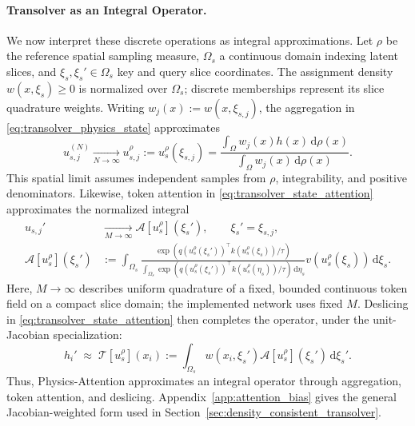 \paragraph{Transolver as an Integral Operator.}
We now interpret these discrete operations as integral approximations.
Let $\rho$ be the reference spatial sampling measure, $\Omega_s$ a
continuous domain indexing latent slices, and $\xi_s,\xi_s'\in\Omega_s$
key and query slice coordinates. The assignment density $w(x,\xi_s)\geq0$
is normalized over $\Omega_s$; discrete memberships represent its slice
quadrature weights. Writing $w_j(x):=w(x,\xi_{s,j})$, the aggregation in
\eqref{eq:transolver_physics_state} approximates
\begin{equation}
    u_{s,j}^{(N)}
    \xrightarrow[N\to\infty]{}
    u_{s,j}^{\rho}:=u_s^{\rho}(\xi_{s,j})
    =\frac{\int_{\Omega}w_j(x)h(x)\,\mathrm{d}\rho(x)}
           {\int_{\Omega}w_j(x)\,\mathrm{d}\rho(x)}.
    \label{eq:transolver_integral_token}
\end{equation}
This spatial limit assumes independent samples from $\rho$, integrability,
and positive denominators. Likewise, token attention in
\eqref{eq:transolver_state_attention} approximates the normalized integral
\begin{equation}
    \begin{aligned}
    u_{s,j}'&\xrightarrow[M\to\infty]{}
        \mathcal{A}[u_s^{\rho}](\xi_s'),\qquad \xi_s'=\xi_{s,j},\\
    \mathcal{A}[u_s^{\rho}](\xi_s')
    &:=\int_{\Omega_s}
      \frac{\exp\!\left(q(u_s^{\rho}(\xi_s'))^{\top}k(u_s^{\rho}(\xi_s))/\tau\right)}
           {\int_{\Omega_s}\exp\!\left(q(u_s^{\rho}(\xi_s'))^{\top}k(u_s^{\rho}(\eta_s))/\tau\right)\,\mathrm{d}\eta_s}
      v(u_s^{\rho}(\xi_s))\,\mathrm{d}\xi_s .
    \end{aligned}
    \label{eq:transolver_integral_attention}
\end{equation}
Here, $M\to\infty$ describes uniform quadrature of a fixed, bounded
continuous token field on a compact slice domain; the implemented network
uses fixed $M$. Deslicing in \eqref{eq:transolver_state_attention} then
completes the operator, under the unit-Jacobian specialization:
\begin{equation}
    h_i'\;\approx\;\mathcal{T}[u_s^{\rho}](x_i)
    :=\int_{\Omega_s}w(x_i,\xi_s')
        \mathcal{A}[u_s^{\rho}](\xi_s')\,\mathrm{d}\xi_s'.
    \label{eq:transolver_deslice}
\end{equation}
Thus, Physics-Attention approximates an integral operator through
aggregation, token attention, and deslicing. Appendix~\ref{app:attention_bias}
gives the general Jacobian-weighted form used in
Section~\ref{sec:density_consistent_transolver}.

